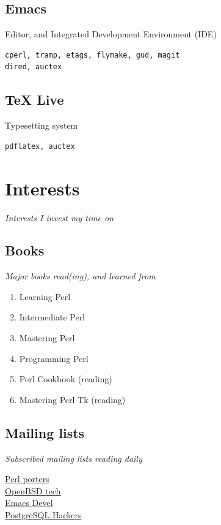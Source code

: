 \documentclass {article}
\begin{document}
    \subsection{Emacs}
    Editor, and Integrated Development Environment (IDE)
      \begin{verbatim}
cperl, tramp, etags, flymake, gud, magit
dired, auctex
   \end{verbatim}

    \subsection{TeX Live}
    Typesetting system
      \begin{verbatim}
pdflatex, auctex
   \end{verbatim}

  \section{Interests}
  \textit{Interests I invest my time on}

    \subsection{Books}
      \textit{Major books read(ing), and learned from}
      \begin{enumerate}
        \item{Learning Perl\cite{learning_perl}}
        \item{Intermediate Perl\cite{intermediate_perl}}
        \item{Mastering Perl\cite{mastering_perl}}
        \item{Programming Perl\cite{programming_perl}}
        \item{Perl Cookbook\cite{perl_cookbook}} (reading)
        \item{Mastering Perl Tk\cite{perl_tk}} (reading)
      \end{enumerate}

    \subsection{Mailing lists}
      \textit{Subscribed mailing lists reading daily}
      \begin{description}
        \item[\href{https://lists.perl.org/list/perl5-porters.html}{Perl porters}]
        \item[\href{https://www.openbsd.org/mail.html}{OpenBSD tech}]
        \item[\href{https://lists.gnu.org/mailman/listinfo/emacs-devel}{Emacs Devel}]
        \item[\href{https://www.postgresql.org/list/pgsql-hackers/}{PostgreSQL Hackers}]
      \end{description}
\end{document}
